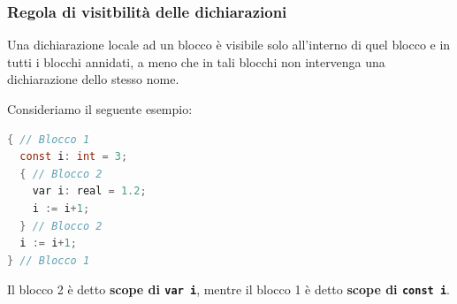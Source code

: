 \documentclass[a4paper]{article}
\begin{document}
\subsubsection{Regola di visitbilità delle dichiarazioni}\label{sec:regola_visibilita_dichiarazioni}
Una dichiarazione locale ad un blocco è visibile solo all'interno di quel
blocco e in tutti i blocchi annidati, a meno che in tali blocchi non
intervenga una dichiarazione dello stesso nome.

\begin{example}
  Consideriamo il seguente esempio:
\begin{lstlisting}[language=C]
{ // Blocco 1
  const i: int = 3;
  { // Blocco 2
    var i: real = 1.2;
    i := i+1;
  } // Blocco 2
  i := i+1;
} // Blocco 1
\end{lstlisting}
  Il blocco 2 è detto \textbf{scope di \texttt{var i}}, mentre il blocco 1
  è detto \textbf{scope di \texttt{const i}}.
\end{example}
\end{document}
